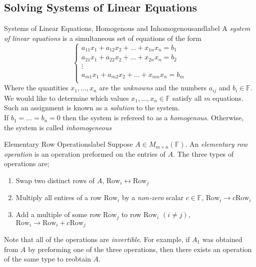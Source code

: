 \documentclass[12pt]{article}
\theoremstyle{definition}
\newcommand{\F}{\ensuremath{\mathbb{F}}}
\begin{document}
\subsection{Solving Systems of Linear Equations}
\begin{definition}{Systems of Linear Equations, Homogenous and Inhomogenousand}{label}
  A \emph{system of linear equations} is a simultaneous set of equations of the form
  $$\begin{cases}
    a_{11}x_1 + a_{12}x_2 + \dots + x_{1n}x_n = b_1\\
    a_{21}x_1 + a_{22}x_2 + \dots + x_{2n}x_n = b_2\\
    \vdots\\
    a_{m1}x_1 + a_{m2}x_2 + \dots + x_{mn}x_n = b_m\\
  \end{cases}$$
  Where the quantities $x_1,\dots,x_n$ are the \emph{unknowns} and the numbers $a_{ij}$ and $b_i \in \mathbb F$. We would like to determine which values $x_1,\dots,x_n \in  \mathbb F$ satisfy all $m$ equations. Such an assignment is known as a \emph{solution} to the system.\\

  If $b_1 = \dots = b_n = 0$ then the system is refereed to as a \emph{homogenous}. Otherwise, the system is called \emph{inhomogeneous}
  
\end{definition}
\begin{definition}{Elementary Row Operations}{label}
  Suppose $A\in M_{m\times n}(\F)$. An \emph{elementary row operation} is an operation preformed on the entries of $A$. The three types of operations are;
  \begin{enumerate}
    \item Swap two distinct rows of $A$, $\text{Row}_i \leftrightarrow \text{Row}_j$
    \item Multiply all entires of a row $\text{Row}_i$ by a \emph{non-zero} scalar $c\in \mathbb F$,  $\text{Row}_i \rightarrow c\text{Row}_i$
    \item Add a multiple of some row $\text{Row}_j$ to row $\text{Row}_i$ $(i \neq j)$, $\text{Row}_i \rightarrow \text{Row}_i + c\text{Row}_j$
  \end{enumerate}
Note that all of the operations are \emph{invertible}. For example, if $A_1$ was obtained from $A$ by preforming one of the three operations, then there exists an operation of the same type to reobtain $A$. 
\end{definition}
\end{document}
